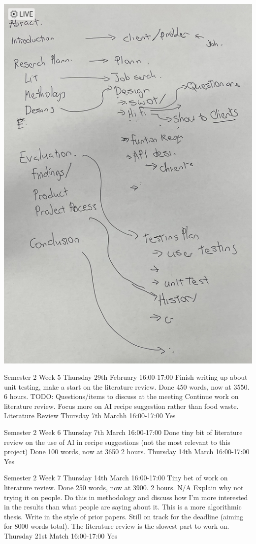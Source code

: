\documentclass[../CHEFCookingHelper.tex]{subfiles}
\begin{document}
\includegraphics[angle=90,width=\textwidth]{appendicies/report_structure.png}

\logbookentry
{Semester 2 Week 5}
{Thursday 29th February 16:00-17:00}
{Finish writing up about unit testing, make a start on the literature review.
Done 450 words, now at 3550.}
{6 hours.}
{TODO: Questions/items to discuss at the meeting}
{Continue work on literature review. Focus more on AI recipe suggestion rather than
food waste.}
{Literature Review}
{Thursday 7th Marchh 16:00-17:00}
{Yes}

\logbookentry
{Semester 2 Week 6}
{Thursday 7th March 16:00-17:00}
{Done tiny bit of literature review on the use of AI in recipe suggestions (not the most relevant to this project)
Done 100 words, now at 3650}
{2 hours.}
{}
{}
{}
{Thursday 14th March 16:00-17:00}
{Yes}

\logbookentry
{Semester 2 Week 7}
{Thursday 14th March 16:00-17:00}
{Tiny bet of work on literature review. Done 250 words, now at 3900.}
{2 hours.}
{N/A}
{Explain why not trying it on people. Do this in methodology and discuss how I'm more interested in the results than what people are saying about it. This is a
more algorithmic thesis. Write in the style of prior papers.} %
{Still on track for the deadline (aiming for 8000 words total). The literature review is the slowest part to work on.}
{Thursday 21st Match 16:00-17:00}
{Yes}
\end{document}
